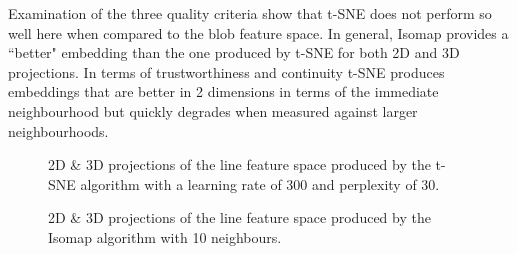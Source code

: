 Examination of the three quality criteria show that t-SNE does not perform so well here when compared to the blob feature space. In general, Isomap provides a ``better" embedding than the one produced by t-SNE for both 2D and 3D projections. In terms of trustworthiness and continuity t-SNE produces embeddings that are better in 2 dimensions in terms of the immediate neighbourhood but quickly degrades when measured against larger neighbourhoods.


\begin{figure}[H]
	\centering
	\caption{2D \& 3D projections of the line feature space produced by the t-SNE algorithm with a learning rate of 300 and perplexity of 30.}\label{fig:line_SNE_mapping}
\end{figure}

\begin{figure}[H]
	\centering
	\caption{2D \& 3D projections of the line feature space  produced by the Isomap algorithm with 10 neighbours.}\label{fig:line_iso_mapping}
\end{figure}

